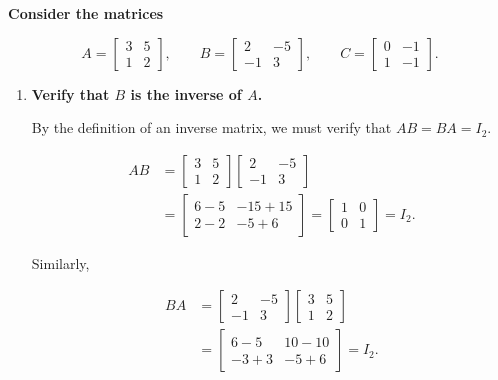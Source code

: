 
\item \textbf{Consider the matrices}

$$
A=
\begin{bmatrix}
    3 & 5 \\
    1 & 2
\end{bmatrix},
\qquad
B=
\begin{bmatrix}
    2 & -5 \\
    -1 & 3
\end{bmatrix},
\qquad
C=
\begin{bmatrix}
    0 & -1 \\
    1 & -1
\end{bmatrix}.
$$

\begin{enumerate}[label=\alph*)]

    \item \textbf{Verify that $B$ is the inverse of $A$.}

    \begin{answer}
        By the definition of an inverse matrix,
        we must verify that $AB=BA=I_2$.

        $$
        \begin{aligned}
        AB
        &=
        \begin{bmatrix}
            3 & 5 \\
            1 & 2
        \end{bmatrix}
        \begin{bmatrix}
            2 & -5 \\
            -1 & 3
        \end{bmatrix}\\
        &=
        \begin{bmatrix}
            6-5 & -15+15 \\
            2-2 & -5+6
        \end{bmatrix}
        =
        \begin{bmatrix}
            1 & 0 \\
            0 & 1
        \end{bmatrix}
        =I_2.
        \end{aligned}
        $$

        Similarly,

        $$
        \begin{aligned}
        BA
        &=
        \begin{bmatrix}
            2 & -5 \\
            -1 & 3
        \end{bmatrix}
        \begin{bmatrix}
            3 & 5 \\
            1 & 2
        \end{bmatrix}\\
        &=
        \begin{bmatrix}
            6-5 & 10-10 \\
            -3+3 & -5+6
        \end{bmatrix}
        =I_2.
        \end{aligned}
        $$


\end{answer}
\end{enumerate}
